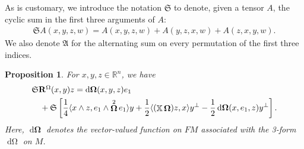 \documentclass[12pt]{amsart}
\numberwithin{numbering}{section}
\theoremstyle{plain}
\newtheorem{pps}[numbering]{Proposition}
\theoremstyle{definition}
\theoremstyle{remark}
\numberwithin{equation}{section}
\DeclareMathOperator{\xx}{\mathbb{X}}
\DeclareMathOperator{\oo}{\mathbf{\Omega}}
\DeclareMathOperator{\doo}{d\mathbf{\Omega}}
\DeclareMathOperator{\mg}{\Omega}
\DeclareMathOperator{\dmg}{d\Omega}
\newcommand{\rsfm}{\mathbf{R}^{\mg}}
\newcommand{\R}{\mathbb{R}}
\newcommand{\frk}[1]{\mathfrak{#1}}
\begin{document}
As is customary, we introduce the notation $\frk{S}$ to denote, given a tensor $A$, the cyclic sum in the first three arguments of $A$:
\begin{align*}
\frk{S} A(x, y, z, w) = A(x, y, z, w) + A(y, z, x, w) + A(z, x, y, w).
\end{align*}
We also denote $\frk{A}$ for the alternating sum on every permutation of the first three indices.

\begin{pps} \label{pps:bianchi}
For $x, y, z \in \R^n$, we have 
\begin{align}
&\frk{S} \rsfm(x, y) z = \doo(x, y, z) e_1 \\ 
&\quad + \frk{S} \left [ \frac{1}{4} \langle x \wedge z, e_1 \wedge \oo^2 e_1 \rangle y + \frac{1}{2} \langle (\xx \oo) z, x \rangle y^\perp - \frac{1}{2} \doo(x, e_1, z) y^\perp \right ]. \notag
\end{align}
Here, $\doo$ denotes the vector-valued function on $FM$ associated with the 3-form $\dmg$ on $M$.
\end{pps}
\end{document}
